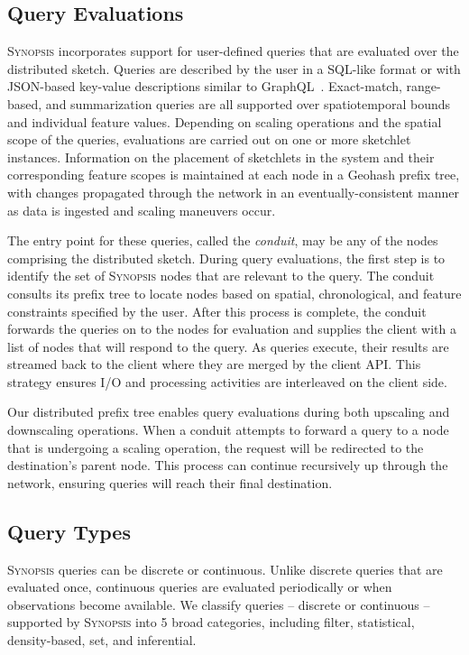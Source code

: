 \subsection{Query Evaluations}
\label{subsec:query-eval}
\textsc{Synopsis} incorporates support for user-defined queries that are evaluated over the distributed sketch.  Queries are described by the user in a SQL-like format or with JSON-based key-value descriptions similar to GraphQL~\cite{graphql}. Exact-match, range-based, and summarization queries are all supported over spatiotemporal bounds and individual feature values. Depending on scaling operations and the spatial scope of the queries, evaluations are carried out on one or more sketchlet instances. Information on the placement of sketchlets in the system and their corresponding feature scopes is maintained at each node in a Geohash prefix tree, with changes propagated through the network in an eventually-consistent manner as data is ingested and scaling maneuvers occur.

The entry point for these queries, called the \emph{conduit}, may be any of the nodes comprising the distributed sketch. During query evaluations, the first step is to identify the set of \textsc{Synopsis} nodes that are relevant to the query. The conduit consults its prefix tree to locate nodes based on spatial, chronological, and feature constraints specified by the user. After this process is complete, the conduit forwards the queries on to the nodes for evaluation and supplies the client with a list of nodes that will respond to the query. As queries execute, their results are streamed back to the client where they are merged by the client API. This strategy ensures I/O and processing activities are interleaved on the client side.

Our distributed prefix tree enables query evaluations during both upscaling and downscaling operations. When a conduit attempts to forward a query to a node that is undergoing a scaling operation, the request will be redirected to the destination's parent node. This process can continue recursively up through the network, ensuring queries will reach their final destination.

\subsection{Query Types}
\textsc{Synopsis} queries can be discrete or continuous. Unlike discrete queries that are evaluated once, continuous queries are evaluated periodically or when observations become available. We classify queries -- discrete or continuous -- supported by \textsc{Synopsis} into 5 broad categories, including filter, statistical, density-based, set, and inferential.

